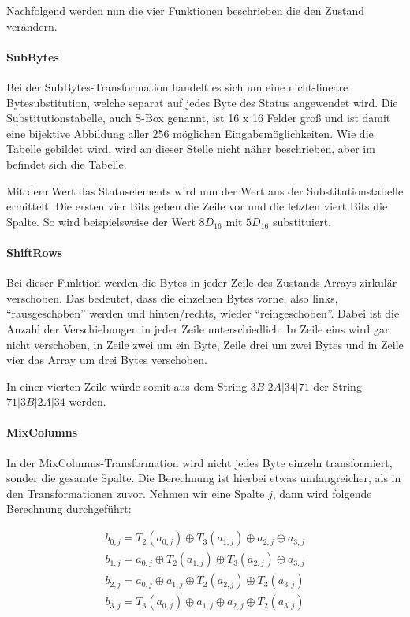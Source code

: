   Nachfolgend werden nun die vier Funktionen beschrieben die den Zustand verändern.
  
  \paragraph{SubBytes}
   Bei der SubBytes-Transformation handelt es sich um eine nicht-lineare Bytesubstitution, welche
   separat auf jedes Byte des Status angewendet wird. Die Substitutionstabelle, auch S-Box genannt,
   ist 16 x 16 Felder groß und ist damit eine bijektive Abbildung aller 256 möglichen Eingabemöglichkeiten.
   Wie die Tabelle gebildet wird, wird an dieser Stelle nicht näher beschrieben, aber im 
   befindet sich die Tabelle.
   
   Mit dem Wert das Statuselements wird nun der Wert aus der Substitutionstabelle ermittelt. Die ersten vier
   Bits geben die Zeile vor und die letzten viert Bits die Spalte. So wird beispielsweise der Wert $8D_{16}$ mit
   $5D_{16}$ substituiert.
   
  \paragraph{ShiftRows}
   Bei dieser Funktion werden die Bytes in jeder Zeile des Zustands-Arrays zirkulär verschoben. Das bedeutet,
   dass die einzelnen Bytes vorne, also links, ``rausgeschoben'' werden und hinten/rechts, wieder
   ``reingeschoben''. Dabei ist  die Anzahl der Verschiebungen in jeder Zeile unterschiedlich. In Zeile eins wird
   gar nicht verschoben, in Zeile zwei um ein Byte, Zeile drei um zwei Bytes und in Zeile vier das Array um drei
   Bytes verschoben.
   
   In einer vierten Zeile würde somit aus dem String $3B | 2A | 34 | 71$ der String $71 | 3B | 2A | 34$ werden.
   
  \paragraph{MixColumns}
   In der MixColumns-Transformation wird nicht jedes Byte einzeln transformiert, sonder die gesamte Spalte.
   Die Berechnung ist hierbei etwas umfangreicher, als in den Transformationen zuvor. Nehmen wir eine Spalte
   $j$, dann wird folgende Berechnung durchgeführt:
   
    \begin{equation*}
     \begin{split}
     b_{0,j} = T_2(a_{0,j}) \oplus T_3(a_{1,j}) \oplus a_{2,j} \oplus a_{3,j} \\
     b_{1,j} = a_{0,j} \oplus T_2(a_{1,j}) \oplus T_3(a_{2,j}) \oplus a_{3,j} \\
     b_{2,j} = a_{0,j} \oplus a_{1,j} \oplus T_2(a_{2,j}) \oplus T_3(a_{3,j}) \\
     b_{3,j} = T_3(a_{0,j}) \oplus a_{1,j} \oplus a_{2,j} \oplus T_2(a_{3,j})
     \end{split}
    \end{equation*}
    
